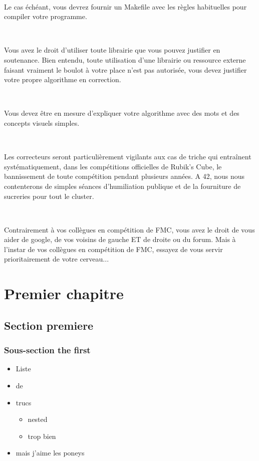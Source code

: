 \documentclass{42}
\begin{document}
\

Le cas \'ech\'eant, vous devrez fournir un Makefile avec les r\`egles habituelles pour compiler votre programme.

\

Vous avez le droit d'utiliser toute librairie que vous pouvez justifier en soutenance. Bien entendu, toute utilisation d'une librairie ou ressource externe faisant vraiment le boulot \`a votre place n'est pas autoris\'ee, vous devez justifier votre propre algorithme en correction.

\

Vous devez \^etre en mesure d'expliquer votre algorithme avec des mots et des concepts visuels simples. 

\

Les correcteurs seront particuli\`erement vigilants aux cas de triche qui entra\^inent syst\'ematiquement, dans les comp\'etitions officielles de Rubik's Cube, le bannissement de toute comp\'etition pendant plusieurs ann\'ees. A 42, nous nous contenterons de simples s\'eances d'humiliation publique et de la fourniture de sucreries pour tout le cluster.

\

Contrairement \`a vos coll\`egues en comp\'etition de FMC, vous avez le droit de vous aider de google, de vos voisins de gauche ET de droite ou du forum. Mais \`a l'instar de vos coll\`egues en comp\'etition de FMC, essayez de vous servir prioritairement de votre cerveau...


\chapter{Premier chapitre}

\section{Section premiere}

\subsection{Sous-section the first}

\begin{itemize}
	\item Liste
	\item de
	\item trucs
	\begin{itemize}
		\item nested
		\item trop bien
	\end{itemize}
	\item mais j'aime les poneys
\end{itemize}
\end{document}
